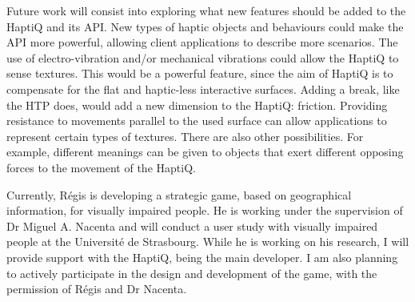 Future work will consist into exploring what new features should be added to the HaptiQ and its API. New types of haptic objects and behaviours could make the API more powerful, allowing client applications to describe more scenarios. The use of electro-vibration and/or mechanical vibrations could allow the HaptiQ to sense textures. This would be a powerful feature, since the aim of HaptiQ is to compensate for the flat and haptic-less interactive surfaces. Adding a break, like the HTP \cite{marquardt2009haptic} does, would add a new dimension to the HaptiQ: friction. Providing resistance to movements parallel to the used surface can allow applications to represent certain types of textures. There are also other possibilities. For example, different meanings can be given to objects that exert different opposing forces to the movement of the HaptiQ. 

Currently, Régis is developing a strategic game, based on geographical information, for visually impaired people. He is working under the supervision of Dr Miguel A. Nacenta and will conduct a user study with visually impaired people at the Université de Strasbourg. While he is working on his research, I will provide support with the HaptiQ, being the main developer. I am also planning to actively participate in the design and development of the game, with the permission of Régis and Dr Nacenta. 
